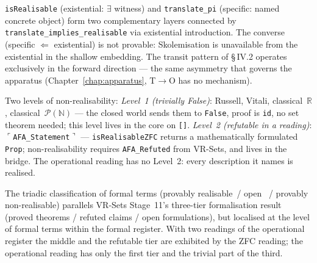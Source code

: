 \begin{remark}
\label{rem:obs5_layers}
\leanok
{}
\texttt{isRealisable} (existential: $\exists$ witness) and
\texttt{translate\_pi} (specific: named concrete object) form two
complementary layers connected by \texttt{translate\_implies\_realisable}
via existential introduction.  The converse (specific $\Leftarrow$
existential) is not provable: Skolemisation is unavailable from the
existential in the shallow embedding.  The transit pattern of §\,IV.2
operates exclusively in the forward direction --- the same asymmetry that
governs the apparatus (Chapter~\ref{chap:apparatus}, T$\to$O has no
mechanism).
\end{remark}

\begin{remark}
\label{rem:obs6_negative}
\leanok
{}
Two levels of non-realisability:
\emph{Level~1 (trivially False)}: Russell, Vitali, classical~$\mathbb{R}$,
classical~$\mathcal{P}(\mathbb{N})$ --- the closed world sends them to
\texttt{False}, proof is \texttt{id}, no set theorem needed; this level lives
in the core on \texttt{[]}.
\emph{Level~2 (refutable in a reading)}: $\ulcorner$\texttt{AFA\_Statement}$\urcorner$
--- \texttt{isRealisableZFC} returns a mathematically formulated
\texttt{Prop}; non-realisability requires \texttt{AFA\_Refuted} from
VR-Sets, and lives in the bridge.  The operational reading has no Level~2:
every description it names is realised.
\end{remark}

\begin{remark}
\label{rem:obs7_triad}
\leanok
{}
The triadic classification of formal terms (provably realisable~/ open ~/
provably non-realisable) parallels VR-Sets Stage~11's three-tier
formalisation result (proved theorems / refuted claims / open formulations),
but localised at the level of formal terms within the formal register.  With
two readings of the operational register the middle and the refutable tier
are exhibited by the ZFC reading; the operational reading has only the
first tier and the trivial part of the third.
\end{remark}

